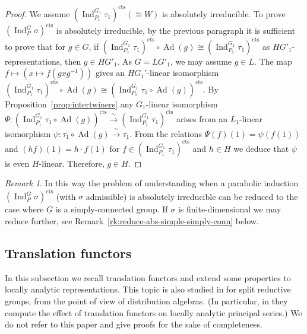 \documentclass[a4paper]{amsart}
\numberwithin{equation}{section}
\theoremstyle{remark}
\newtheorem{remark}[thm]{Remark}
\theoremstyle{definition}
\DeclareMathOperator{\Ind}{Ind}
\DeclareMathOperator{\Ad}{Ad}
\newcommand{\alggrp}[1]{\underline{#1}}
\newcommand{\cts}{\mathrm{cts}}
\newcommand{\congto}{\xrightarrow{\,\sim\,}}
\renewcommand{\simeq}{\cong}
\begin{document}
\begin{proof}
We assume $(\Ind_{P_{1}}^{G_{1}}\tau_{1})^{\cts} (\cong W)$ is absolutely irreducible.
To prove $(\Ind_{P}^{G}\sigma)^{\cts}$ is absolutely irreducible, by the previous paragraph it is sufficient to prove that for $g\in G$, if $(\Ind_{P_{1}}^{G_{1}}\tau_{1})^{\cts}\circ\Ad(g)\simeq (\Ind_{P_{1}}^{G_{1}}\tau_{1})^{\cts}$ as $HG'_{1}$-representations, then $g\in HG'_{1}$.
As $G = LG'_{1}$, we may assume $g\in L$.
The map $f\mapsto (x\mapsto f(gxg^{-1}))$ gives an $HG_1'$-linear isomorphism $(\Ind_{P_{1}}^{G_{1}}\tau_{1})^{\cts}\circ \Ad(g)\simeq (\Ind_{P_{1}}^{G_{1}}\tau_{1}\circ\Ad(g))^{\cts}$.
By Proposition~\ref{prop:intertwiners} any $G_1$-linear isomorphism $\Psi \colon (\Ind_{P_{1}}^{G_{1}}\tau_{1}\circ\Ad(g))^{\cts} \congto (\Ind_{P_{1}}^{G_{1}}\tau_{1})^{\cts}$
arises from an $L_1$-linear isomorphism $\psi \colon \tau_{1}\circ\Ad(g)\congto \tau_{1}$.
From the relations $\Psi(f)(1) = \psi(f(1))$ and $(hf)(1) = h\cdot f(1)$ for $f \in (\Ind_{P_{1}}^{G_{1}}\tau_{1})^{\cts}$ and $h\in H$ we deduce that $\psi$ is even $H$-linear.
Therefore, $g \in H$.
\end{proof}


\begin{remark}\label{rk:reduce-simply-conn}
  In this way the problem of understanding when a parabolic induction $(\Ind_{P}^{G}\sigma)^{\cts}$ (with $\sigma$ admissible) is absolutely irreducible can be reduced to the case where $\alggrp G$ is a simply-connected group.
  If $\sigma$ is finite-dimensional we may reduce further, see Remark~\ref{rk:reduce-abs-simple-simply-conn} below.
\end{remark}

\subsection{Translation functors}
\label{sec:translation-functors}
In this subsection we recall translation functors and extend some properties to locally analytic representations.
This topic is also studied in \cite{arxiv.2107.08493} for split reductive groups, from the point of view of distribution algebras.
(In particular, in \cite[Theorem 4.2.12]{arxiv.2107.08493} they compute the effect of translation functors on locally analytic principal series.)
We do not refer to this paper and give proofs for the sake of completeness.
\end{document}
